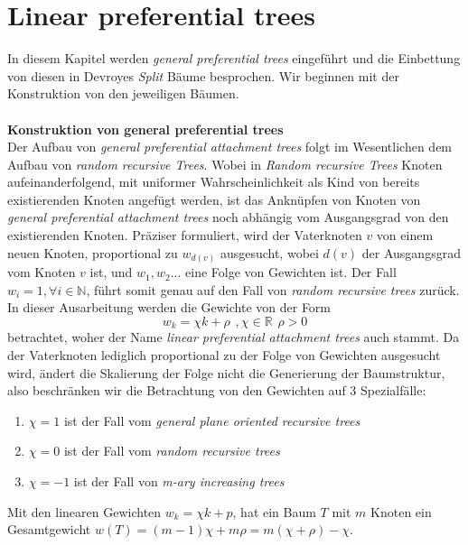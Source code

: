 \chapter{Linear preferential trees} 
In diesem Kapitel werden \textit{general preferential trees} eingeführt und die Einbettung von diesen in Devroyes \textit{Split} Bäume besprochen. Wir beginnen mit der Konstruktion von den jeweiligen Bäumen.
\\
\\
\textbf{\fontsize{14}{18}\selectfont Konstruktion von general preferential trees}\\
Der Aufbau von \textit{general preferential attachment trees} folgt im Wesentlichen dem Aufbau von \textit{random recursive Trees}. Wobei in \textit{Random recursive Trees} Knoten aufeinanderfolgend, mit uniformer Wahrscheinlichkeit als Kind von bereits existierenden Knoten angefügt werden, ist das Anknüpfen von Knoten von \textit{general preferential attachment trees} noch abhängig vom Ausgangsgrad von den existierenden Knoten. Präziser formuliert, wird der Vaterknoten $v$ von einem neuen Knoten, proportional zu $w_{d(v)}$ ausgesucht, wobei $d(v)$ der Ausgangsgrad vom Knoten $v$ ist, und $w_1, w_2...$ eine Folge von Gewichten ist. Der Fall $w_i = 1, \forall i \in \mathbb{N}$, führt somit genau auf den Fall von \textit{random recursive trees} zurück. In dieser Ausarbeitung werden die Gewichte von der Form 
\[
w_k = \chi k + \rho \hspace{5pt}, \chi \in \mathbb{R}\hspace{5pt} \rho > 0
\]
betrachtet, woher der Name \textit{linear preferential attachment trees} auch stammt. Da der Vaterknoten lediglich proportional zu der Folge von Gewichten ausgesucht wird, ändert die Skalierung der Folge nicht die Generierung der Baumstruktur, also beschränken wir die Betrachtung von den Gewichten auf 3 Spezialfälle:
\begin{enumerate}
    \item $\chi = 1$ ist der Fall vom \textit{general plane oriented recursive trees} \cite{panholzer2007level} 
    \item $\chi = 0$ ist der Fall vom \textit{random recursive trees}
    \item $\chi = -1$ ist der Fall von \textit{m-ary increasing trees}
\end{enumerate}
\begin{theorem}
\cite[Lemma 3.1]{janson2019random}
\label{Gewichte Satz}
   Mit den linearen Gewichten $w_k = \chi k + p $, hat ein Baum $T$ mit $m$ Knoten ein Gesamtgewicht $w(T) = (m-1)\chi + m\rho = m(\chi + \rho) - \chi$.
\end{theorem}
